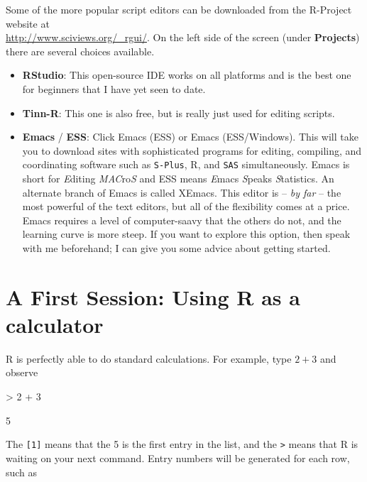 \documentclass[english]{article}
\renewenvironment{Schunk}{\vspace{\topsep}}{\vspace{\topsep}}
\begin{document}
\begin{enumerate}
Some of the more popular script editors can be downloaded from the
R-Project website at \\
\url{http://www.sciviews.org/_rgui/}. On the left side of the screen
(under \textbf{Projects}) there are several choices available.

\begin{itemize}
\item \textbf{RStudio}: This open-source IDE works on all platforms and
is the best one for beginners that I have yet seen to date.
\item \textbf{Tinn-}\textsf{\textbf{R}}: This one is also free, but is really
just used for editing scripts.
\item \textbf{Emacs} / \textbf{ESS}: Click Emacs (ESS) or Emacs (ESS/Windows).
This will take you to download sites with sophisticated programs for
editing, compiling, and coordinating software such as \texttt{S-Plus},
\textsf{R}, and \texttt{SAS} simultaneously. Emacs is short for \emph{E}diting
\emph{MAC}ro\emph{S} and ESS means \emph{E}macs \emph{S}peaks \emph{S}tatistics.
An alternate branch of Emacs is called XEmacs. This editor is -- \emph{by
far} -- the most powerful of the text editors, but all of the flexibility
comes at a price. Emacs requires a level of computer-saavy that the
others do not, and the learning curve is more steep. If you want to
explore this option, then speak with me beforehand; I can give you
some advice about getting started.
\end{itemize}

\end{enumerate}

\section{A First Session: Using \textsf{R} as a calculator}


\textsf{R} is perfectly able to do standard calculations. For example,
type $2+3$ and observe

\begin{Schunk}
\begin{Sinput}
> 2 + 3
\end{Sinput}
\begin{Soutput}
[1] 5
\end{Soutput}
\end{Schunk}

The \texttt{{[}1{]}} means that the 5 is the first entry in the list,
and the \texttt{>} means that \textsf{R} is waiting on your next command.
Entry numbers will be generated for each row, such as
\end{document}
